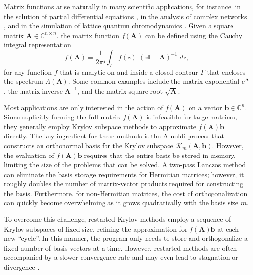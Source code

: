 \documentclass[smallextended]{svjour3}
\renewcommand{\vec}[1]{\mathbf{#1}}
\newcommand{\mat}[1]{\mathbf{#1}}
\begin{document}
Matrix functions arise naturally in many scientific applications, for instance, in the solution of partial differential equations \cite{borner_three-dimensional_2015,guttel_rational_2013,hochbruck_exponential_2010,strutt_theory_2011}, in the analysis of complex networks \cite{benzi_matrix_2020,benzi_rational_2022,higham_functions_2008}, and in the simulation of lattice quantum chromodynamics \cite{bloch_nested_2011,van_den_eshof_numerical_2002}. Given a square matrix $\mat{A} \in \mathbb{C}^{n \times n}$, the matrix function $f(\mat{A})$ can be defined using the Cauchy integral representation \cite{higham_functions_2008}
\begin{equation}
\label{eq:cauchy_def}
f(\mathbf{A}) = \frac{1}{2\pi i} \int_{\Gamma} f(z) \; (z\mathbf{I} - \mathbf{A})^{-1} \; dz,
\end{equation}
for any function $f$ that is analytic on and inside a closed contour $\Gamma$ that encloses the spectrum $\Lambda(\mat{A})$. Some common examples include the matrix exponential $e^\mat{A}$, the matrix inverse $\mat{A}^{-1}$, and the matrix square root $\sqrt{\mat{A}}$.

Most applications are only interested in the action of $f(\mat{A})$ on a vector $\vec{b} \in \mathbb{C}^{n}$. Since explicitly forming the full matrix $f(\mat{A})$ is infeasible for large matrices, they generally employ Krylov subspace methods \cite{guttel_rational_2013,guttel_limited-memory_2020} to approximate $f(\mat{A}) \vec{b}$ directly. The key ingredient for these methods is the Arnoldi process that constructs an orthonormal basis for the Krylov subspace $\mathcal{K}_m(\mat{A}, \vec{b})$. However, the evaluation of $f(\mat{A}) \vec{b}$ requires that the entire basis be stored in memory, limiting the size of the problems that can be solved. A two-pass Lanczos method \cite{frommer_matrix_2008} can eliminate the basis storage requirements for Hermitian matrices; however, it roughly doubles the number of matrix-vector products required for constructing the basis. Furthermore, for non-Hermitian matrices, the cost of orthogonalization can quickly become overwhelming as it grows quadratically with the basis size $m$.

To overcome this challenge, restarted Krylov methods \cite{afanasjew_implementation_2008,eiermann_restarted_2006,eiermann_deflated_2011,frommer_efficient_2014,guttel_limited-memory_2020} employ a sequence of Krylov subspaces of fixed size, refining the approximation for $f(\mat{A}) \vec{b}$ at each new ``cycle''. In this manner, the program only needs to store and orthogonalize a fixed number of basis vectors at a time. However, restarted methods are often accompanied by a slower convergence rate and may even lead to stagnation or divergence \cite{schweitzer_any_2016,simoncini_convergence_2000}.
\end{document}
